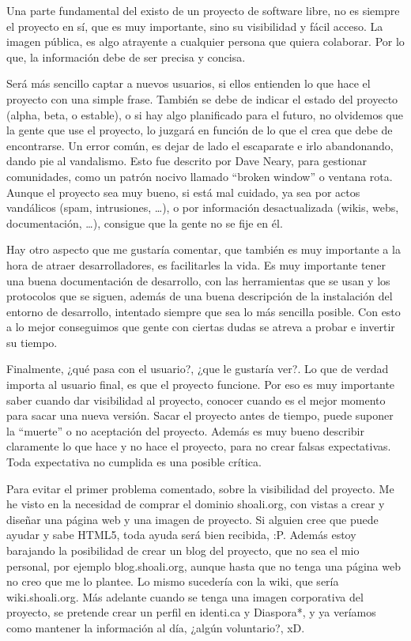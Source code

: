 \documentclass[a4paper, 12pt]{book}
\begin{document}
Una parte fundamental del existo de un proyecto de software libre, no es siempre el proyecto en sí, que es muy importante, sino su visibilidad y fácil acceso.  La imagen pública, es algo atrayente a cualquier persona que quiera colaborar. Por lo que, la información debe de ser precisa y concisa.

Será más sencillo captar a nuevos usuarios, si ellos entienden lo que hace el proyecto con una simple frase. También se debe de indicar el estado del proyecto (alpha, beta, o estable), o si hay algo planificado para el futuro, no olvidemos que la gente que use el proyecto, lo juzgará en función de lo que el crea que debe de encontrarse.  Un error común, es dejar de lado el escaparate e irlo abandonando, dando pie al vandalismo. Esto fue descrito por Dave Neary, para gestionar comunidades, como un patrón nocivo llamado  “broken window” o ventana rota. Aunque el proyecto sea muy bueno, si está mal cuidado, ya sea por actos vandálicos (spam, intrusiones, …), o por información desactualizada (wikis, webs, documentación, …), consigue que la gente no se fije en él.

Hay otro aspecto que me gustaría comentar, que también es muy importante a la hora de atraer desarrolladores, es facilitarles la vida. Es muy importante tener una buena documentación de desarrollo, con las herramientas que se usan y los protocolos que se siguen, además de una buena descripción de la instalación del entorno de desarrollo, intentado siempre que sea lo más sencilla posible. Con esto a lo mejor conseguimos que gente con ciertas dudas se atreva a probar e invertir su tiempo.

Finalmente, ¿qué pasa con el usuario?, ¿que le gustaría ver?. Lo que de verdad importa al usuario final, es que el proyecto funcione.  Por eso es muy importante saber cuando dar visibilidad al proyecto, conocer cuando es el mejor momento para sacar una nueva versión. Sacar el proyecto antes de tiempo, puede suponer la “muerte” o no aceptación del proyecto. Además es muy bueno describir claramente lo que hace y no hace el proyecto, para no crear falsas expectativas. Toda expectativa no cumplida es una posible crítica.

Para evitar el primer problema comentado, sobre la visibilidad del proyecto. Me he visto en la necesidad de comprar el dominio shoali.org, con vistas a crear y diseñar una página web y una imagen de proyecto. Si alguien cree que puede ayudar y sabe HTML5, toda ayuda será bien recibida, :P. Además estoy barajando la posibilidad de crear un blog del proyecto, que no sea el mio personal, por ejemplo blog.shoali.org, aunque hasta que no tenga una página web no creo que me lo plantee. Lo mismo sucedería con la wiki, que sería wiki.shoali.org. Más adelante cuando se tenga una imagen corporativa del proyecto, se pretende crear un perfil en identi.ca y Diaspora*, y ya veríamos como mantener la información al día, ¿algún voluntario?, xD.
\end{document}
